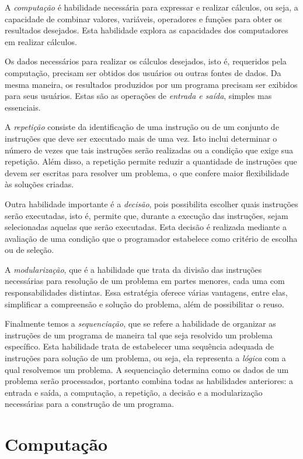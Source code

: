 \documentclass[
]{book}
\begin{document}
A \emph{computação} é habilidade necessária para expressar e realizar cálculos, ou seja, a capacidade de combinar valores, variáveis, operadores e funções para obter os resultados desejados. Esta habilidade explora as capacidades dos computadores em realizar cálculos.

Os dados necessários para realizar os cálculos desejados, isto é, requeridos pela computação, precisam ser obtidos dos usuários ou outras fontes de dados. Da mesma maneira, os resultados produzidos por um programa precisam ser exibidos para seus usuários. Estas são as operações de \emph{entrada e saída}, simples mas essenciais.

A \emph{repetição} consiste da identificação de uma instrução ou de um conjunto de instruções que deve ser executado mais de uma vez. Isto inclui determinar o número de vezes que tais instruções serão realizadas ou a condição que exige sua repetição. Além disso, a repetição permite reduzir a quantidade de instruções que devem ser escritas para resolver um problema, o que confere maior flexibilidade às soluções criadas.

Outra habilidade importante é a \emph{decisão}, pois possibilita escolher quais instruções serão executadas, isto é, permite que, durante a execução das instruções, sejam selecionadas aquelas que serão executadas. Esta decisão é realizada mediante a avaliação de uma condição que o programador estabelece como critério de escolha ou de seleção.

A \emph{modularização}, que é a habilidade que trata da divisão das instruções necessárias para resolução de um problema em partes menores, cada uma com responsabilidades distintas. Essa estratégia oferece várias vantagens, entre elas, simplificar a compreensão e solução do problema, além de possibilitar o reuso.

Finalmente temos a \emph{sequenciação}, que se refere a habilidade de organizar as instruções de um programa de maneira tal que seja resolvido um problema específico. Esta habilidade trata de estabelecer uma sequência adequada de instruções para solução de um problema, ou seja, ela representa a \emph{lógica} com a qual resolvemos um problema. A sequenciação determina como os dados de um problema serão processados, portanto combina todas as habilidades anteriores: a entrada e saída, a computação, a repetição, a decisão e a modularização necessárias para a construção de um programa.

\hypertarget{comput}{%
\chapter{Computação}\label{comput}}
\end{document}
